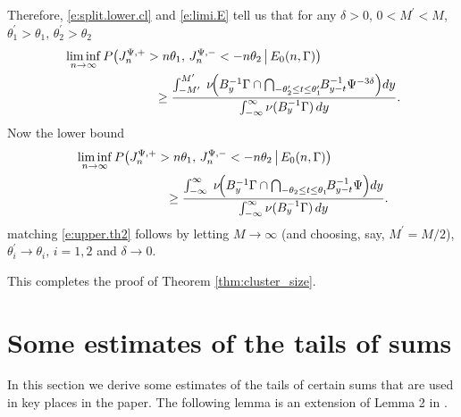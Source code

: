 \documentclass[11pt,reqno]{amsart}
\numberwithin{equation}{section}
\theoremstyle{definition}
\theoremstyle{remark}
\theoremstyle{definition}
\begin{document}
  Therefore, \eqref{e:split.lower.cl} and \eqref{e:limi.E} tell us
  that for any $\delta>0$, $0<M^\prime <M$, $   \theta_1^\prime>\theta_1, \,
\theta_2^\prime>\theta_2$
  \begin{align*}&\liminf_{n\to\infty} P\big(J_n^{\Psi,+} > n\theta_1,\, J_n^{\Psi,-} <
-n\theta_2 \,\big|\, E_0(n,\Gamma)\big) \\ 
  &\hskip 1in     \geq \frac{\int_{-M^\prime}^{M^\prime}  \;
        \nu\!\Big(B_y^{-1} \Gamma \cap \bigcap_{-\theta_2^\prime\le t \le \theta_1^\prime} \!\!  B_{y-t}^{-1}\Psi^{-3\delta}\Big) dy}
        {\int_{-\infty}^\infty \nu(B_y^{-1} \Gamma) \,dy}. 
 \end{align*}
 Now the lower bound
 \begin{align*}&\liminf_{n\to\infty} P\big(J_n^{\Psi,+} > n\theta_1,\, J_n^{\Psi,-} <
-n\theta_2 \,\big|\, E_0(n,\Gamma)\big) \\ 
  &\hskip 1in     \geq \frac{\int_{-\infty}^{\infty}  \;
        \nu\!\Big(B_y^{-1} \Gamma \cap \bigcap_{-\theta_2\le t \le \theta_1} \!\!  B_{y-t}^{-1}\Psi\Big) dy}
        {\int_{-\infty}^\infty \nu(B_y^{-1} \Gamma) \,dy}. 
 \end{align*}
matching \eqref{e:upper.th2} follows by letting $M\to\infty$ (and
choosing, say, $M^\prime=M/2$), $\theta_i^\prime\to\theta_i, \, i=1,2$
and $\delta\to 0$. 

This completes the proof of Theorem \ref{thm:cluster_size}. 








\section{Some estimates of the tails of sums}\label{sec:lemmas}

In this section we derive some estimates of the tails of certain sums
that are used in key places in the paper. The following lemma is an
extension of Lemma 2 in \cite{wang:samorodnitsky:2025}. 
\end{document}
